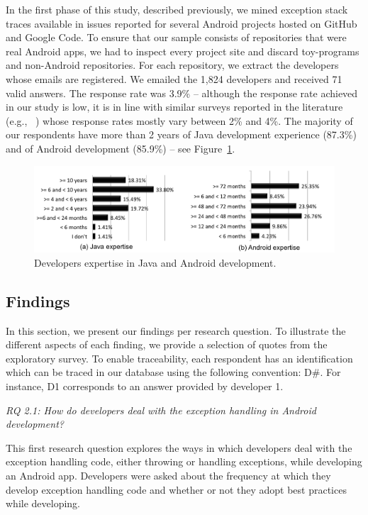 {%
 In the first phase of this study, described previously, we mined exception stack traces available in issues reported for several Android projects hosted on GitHub and Google Code. To ensure that our sample consists of repositories that were real Android apps, we had to inspect every project site and discard toy-programs and non-Android repositories. For each repository, we extract the developers whose emails are registered. We emailed the 1,824 developers and received 71 valid answers. The response rate was 3.9\% --
although the response rate achieved in our study is low, it is in line with similar surveys reported in the literature (e.g., ~\cite{kochhar2015understanding,joorabchi2013real,bavota2015impact,ko2007information,hindle2015topics}) whose response rates mostly vary between 2\% and 4\%.
The majority of our respondents have more than 2 years of Java development experience (87.3\%) and of Android development (85.9\%) -- see Figure~\ref{fig:devexpertise}.

\begin{figure} \centering \includegraphics[scale=0.38]{expertise_new_point.png}
\caption{Developers expertise in Java and Android development.}
\label{fig:devexpertise}
\end{figure}

\subsection{Findings}

In this section, we present our findings per research question.
To illustrate the different aspects of each
finding, we provide a selection of quotes from the exploratory
survey.
To enable traceability, each respondent has an identification
 which can be traced in our database using the following convention:
D\#. For instance, D1 corresponds to an answer provided
 by developer 1.

\bigskip
\noindent\emph{RQ 2.1: How do developers deal with the exception handling in Android development?}
\bigskip

This first research question explores the ways in which developers deal with the exception handling code, either throwing or handling exceptions,  while developing an Android app.  Developers were asked about the frequency at which they develop exception handling code and whether or not they adopt best practices while developing.

}
